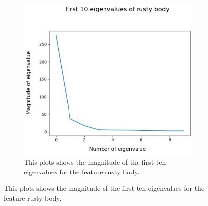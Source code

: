 
\begin{figure}[!h]
	\centering
	\begin{subfigure}{0.7\textwidth}
		\includegraphics[width=0.9\linewidth]{Figures/chapter04/pca_rustybody_graph.png} 
		\caption{This plots shows the magnitude of the first ten eigenvalues for the feature rusty body.}
	\end{subfigure}
	\vspace{20pt}
	

\end{figure}
